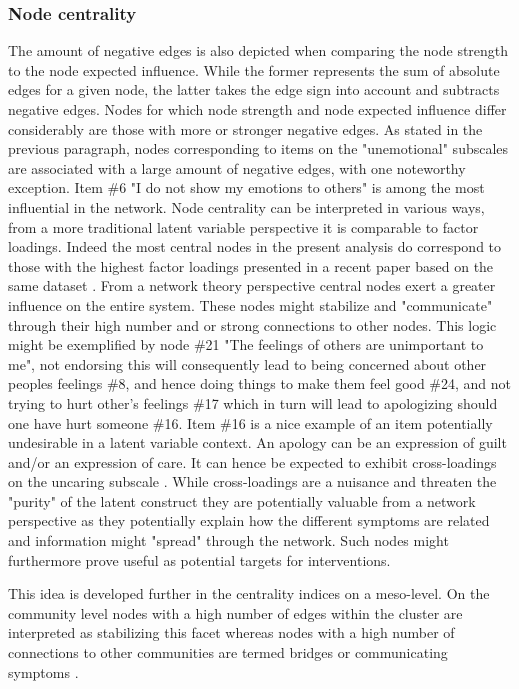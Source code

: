 \subsubsection{Node centrality}
The amount of negative edges is also depicted when comparing the node strength to the node expected influence. 
While the former represents the sum of absolute edges for a given node, the latter takes the edge sign into account and subtracts negative edges. 
Nodes for which node strength and node expected influence differ considerably are those with more or stronger negative edges.
As stated in the previous paragraph, nodes corresponding to items on the "unemotional" subscales are associated with a large amount of negative edges, with one noteworthy exception.
Item \#6 "I do not show my emotions to others" is among the most influential in the network.
Node centrality can be interpreted in various ways, from a more traditional latent variable perspective it is comparable to factor loadings. 
Indeed the most central nodes in the present analysis do correspond to those with the highest factor loadings presented in a recent paper based on the same dataset
\parencite{kliem_factor_2019}.
From a network theory perspective central nodes exert a greater influence on the entire system. 
These nodes might stabilize and "communicate" through their high number and or strong connections to other nodes.
This logic might be exemplified by node \#21 "The feelings of others are unimportant to me", 
not endorsing this will consequently lead to being concerned about other peoples feelings \#8,
and hence doing things to make them feel good \#24,
and not trying to hurt other's feelings \#17 which in turn will lead to apologizing should one have hurt someone \#16.
Item \#16 is a nice example of an item potentially undesirable in a latent variable context. 
An apology can be an expression of guilt and/or an expression of care. 
It can hence be expected to exhibit cross-loadings on the uncaring subscale \parencite{essau_callous-unemotional_2006}.
While cross-loadings are a  nuisance and threaten the "purity" of the latent construct they are potentially valuable from a network perspective as they potentially explain how the different symptoms are related
and information might "spread" through the network. 
Such nodes might furthermore prove useful as potential targets for interventions.

This idea is developed further in the centrality indices on a meso-level.
On the community level nodes with a high number of edges within the cluster are interpreted as stabilizing this facet whereas nodes with a high number of connections to other communities are termed
bridges \parencite{robinaugh_identifying_2016} or communicating symptoms \parencite{blanken_role_2018}.

